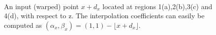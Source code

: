 \documentclass[11pt]{article}
\begin{document}
\begin{figure}[ht]
\centering
    \\
    \caption{An input (warped) point $x+d_{x}$ located at regions 1(a),2(b),3(c) and 4(d), with respect to z. The interpolation coefficients can easily be computed as $(\alpha_{x}, \beta_{x})=(1,1)-\lfloor x+d_{x}\rfloor$. }
    \label{fig:dayIndex}
\end{figure}
\end{document}
